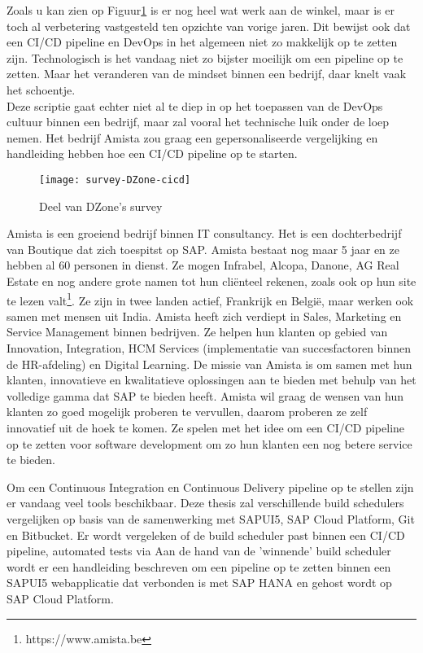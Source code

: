 Zoals u kan zien op Figuur\ref{img-survey-cicd} is er nog heel wat werk aan de winkel, maar is er toch al verbetering vastgesteld ten opzichte van vorige jaren. Dit bewijst ook dat een CI/CD pipeline en DevOps in het algemeen niet zo makkelijk op te zetten zijn. Technologisch is het vandaag niet zo bijster moeilijk om een pipeline op te zetten. Maar het veranderen van de mindset binnen een bedrijf, daar knelt vaak het schoentje.\\
Deze scriptie gaat echter niet al te diep in op het toepassen van de DevOps cultuur binnen een bedrijf, maar zal vooral het technische luik onder de loep nemen. Het bedrijf Amista zou graag een gepersonaliseerde vergelijking en handleiding hebben hoe een CI/CD pipeline op te starten.

\begin{figure}	
    \texttt{[image: survey-DZone-cicd]}
    \caption{Deel van DZone's survey ~\autocite{Baker2019}} \label{img-survey-cicd}
\end{figure}

Amista is een groeiend bedrijf binnen IT consultancy. Het is een dochterbedrijf van Boutique dat zich toespitst op SAP. Amista bestaat nog maar 5 jaar en ze hebben al 60 personen in dienst. Ze mogen Infrabel, Alcopa, Danone, AG Real Estate en nog andere grote namen tot hun cliënteel rekenen, zoals ook op hun site te lezen valt\footnote{https://www.amista.be}. %
Ze zijn in twee landen actief, Frankrijk en België, maar werken ook samen met mensen uit India.
Amista heeft zich verdiept in Sales, Marketing en Service Management binnen bedrijven. Ze helpen hun klanten op gebied van Innovation, Integration, HCM Services (implementatie van succesfactoren binnen de HR-afdeling) en Digital Learning.
De missie van Amista is om samen met hun klanten, innovatieve en kwalitatieve oplossingen aan te bieden met behulp van het volledige gamma dat SAP te bieden heeft.
Amista wil graag de wensen van hun klanten zo goed mogelijk proberen te vervullen, daarom proberen ze zelf innovatief uit de hoek te komen. Ze spelen met het idee om een CI/CD pipeline op te zetten voor software development om zo hun klanten een nog betere service te bieden.

Om een Continuous Integration en Continuous Delivery pipeline op te stellen zijn er vandaag veel tools beschikbaar.
Deze thesis zal verschillende build schedulers vergelijken op basis van de samenwerking met SAPUI5, SAP Cloud Platform, Git en Bitbucket. Er wordt vergeleken of de build scheduler past binnen een CI/CD pipeline, automated tests via %
Aan de hand van de 'winnende' build scheduler wordt er een handleiding beschreven om een pipeline op te zetten binnen een SAPUI5 webapplicatie dat verbonden is met SAP HANA en gehost wordt op SAP Cloud Platform.

